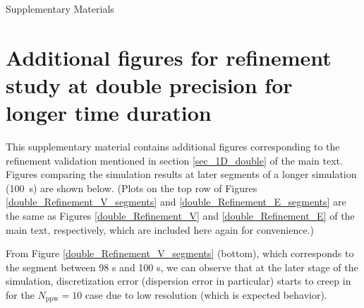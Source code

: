 
% 





% 




\begin{center}
\large
Supplementary Materials
\end{center}

\supp

\section{Additional figures for refinement study at double precision for longer time duration}\label{SM_double_additional}
%
This supplementary material contains additional figures corresponding to the refinement validation mentioned in section \ref{sec_1D_double} of the main text.
%
Figures comparing the simulation results at later segments of a longer simulation (100~s) are shown below.
%
(Plots on the top row of Figures \ref{double_Refinement_V_segments} and \ref{double_Refinement_E_segments} are the same as Figures \ref{double_Refinement_V} and \ref{double_Refinement_E} of the main text, respectively, which are included here again for convenience.)


From Figure \ref{double_Refinement_V_segments} (bottom), which corresponds to the segment between 98 s and 100 s, we can observe that at the later stage of the simulation, discretization error (dispersion error in particular) starts to creep in for the $N_\text{ppw} = 10$ case due to low resolution (which is expected behavior). 


